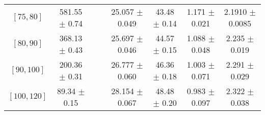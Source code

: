 \begin{tabular}{c||c|c|c|c|c|c|c}
$[75, 80]$ & 581.55 $\pm$ 0.74 &  &  & 25.057 $\pm$ 0.049 & 43.48 $\pm$ 0.14 & 1.171 $\pm$ 0.021 & 2.1910 $\pm$ 0.0085\\
$[80, 90]$ & 368.13 $\pm$ 0.43 &  &  & 25.697 $\pm$ 0.046 & 44.57 $\pm$ 0.15 & 1.088 $\pm$ 0.048 & 2.235 $\pm$ 0.019\\
$[90, 100]$ & 200.36 $\pm$ 0.31 &  &  & 26.777 $\pm$ 0.060 & 46.36 $\pm$ 0.18 & 1.003 $\pm$ 0.071 & 2.291 $\pm$ 0.029\\
$[100, 120]$ & 89.34 $\pm$ 0.15 &  &  & 28.154 $\pm$ 0.067 & 48.48 $\pm$ 0.20 & 0.983 $\pm$ 0.097 & 2.322 $\pm$ 0.038\\
\end{tabular}
